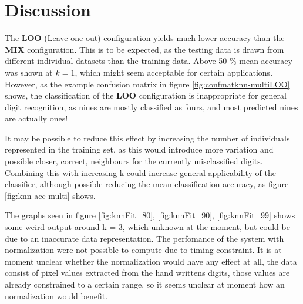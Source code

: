 \section{Discussion}
The \textbf{LOO} (Leave-one-out) configuration
yields much lower accuracy than the \textbf{MIX} configuration.
This is to be expected, as the testing data is drawn from different individual datasets
than the training data. Above 50 \% mean accuracy was shown at \(k=1\),
which might seem acceptable for certain applications.
However, as the example confusion matrix in figure \ref{fig:confmatknn-multiLOO} shows,
the classification of the \textbf{LOO} configuration is inappropriate
for general digit recognition, as nines are mostly classified as fours,
and most predicted nines are actually ones!

It may be possible to reduce this effect by increasing the number
of individuals represented in the training set, as this would introduce more
variation and possible closer, correct, neighbours for the currently
misclassified digits.
Combining this with increasing k could increase general applicability of the classifier,
although possible reducing the mean classification accuracy,
as figure \ref{fig:knn-acc-multi} shows.



The graphs seen in figure \ref{fig:knnFit_80}, \ref{fig:knnFit_90}, \ref{fig:knnFit_99} 
shows some weird output around k = 3, which unknown at the moment, but could be
due to an inaccurate data representation.  The perfomance of the system with normalization 
were not possible to compute due to timing constraint. It is at moment unclear whether the normalization would have any effect at all, the data consist of pixel values extracted from the 
hand writtens digits, those values are already constrained to a certain range, so it seems unclear at moment how an normalization would benefit.   
